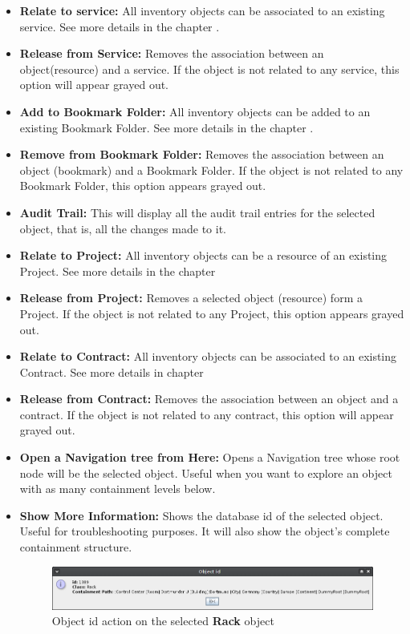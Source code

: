 \documentclass[a4paper]{article}
\begin{document}
\begin{itemize}
		\item \textbf{Relate to service:} All inventory objects can be associated to an existing service. See more details in the chapter .
		\item \textbf{Release from Service:} Removes the association between an object(resource) and a service. If the object is not related to any service, this option will appear grayed out.
		\item \textbf{Add to Bookmark Folder:} All inventory objects can be added to an existing Bookmark Folder. See more details in the chapter .
		\item \textbf{Remove from Bookmark Folder:} Removes the association between an object (bookmark) and a Bookmark Folder. If the object is not related to any Bookmark Folder, this option appears grayed out.
		\item \textbf{Audit Trail:} This will display all the audit trail entries for the selected object, that is, all the changes made to it.
		\item \textbf{Relate to Project:} All inventory objects can be a resource of an existing Project. See more details in the chapter 
		\item \textbf{Release from Project:} Removes a selected object (resource) form a Project. If the object is not related to any Project, this option appears grayed out.
		\item \textbf{Relate to Contract:} All inventory objects can be associated to an existing Contract. See more details in chapter 
		\item \textbf{Release from Contract:} Removes the association between an object and a contract. If the object is not related to any contract, this option will appear grayed out.
		\item \textbf{Open a Navigation tree from Here:} Opens a Navigation tree whose root node will be the selected object. Useful when you want to explore an object with as many containment levels below.
		\item \textbf{Show More Information:} Shows the database id of the selected object. Useful for troubleshooting purposes. It will also show the object's complete containment structure.
			\begin{figure}[h!]
				\centering
				\includegraphics[width=\linewidth]{img/action_show_object_id.png}
				\caption{Object id action on the selected \textbf{Rack} object}
				\label{fig:action_show_object_id}
			\end{figure}
	\end{itemize}
\end{document}
